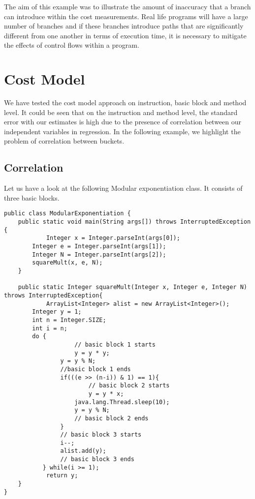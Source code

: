 The aim of this example was to illustrate the amount of inaccuracy that a branch can introduce within the cost measurements. Real life programs will have a large number of branches and if these branches introduce paths that are significantly different from one another in terms of execution time, it is necessary to mitigate the effects of control flows within a program. \newline

\section{Cost Model}
We have tested the cost model approach on instruction, basic block and method level. It could be seen that on the instruction and method level, the standard error with our estimates is high due to the presence of correlation between our independent variables in regression. In the following example, we highlight the problem of correlation between buckets.

\subsection{Correlation}

Let us have a look at the following Modular exponentiation class. It consists of three basic blocks.

\singlespacing
\begin{lstlisting}
public class ModularExponentiation {
	public static void main(String args[]) throws InterruptedException {
    		Integer x = Integer.parseInt(args[0]);
        Integer e = Integer.parseInt(args[1]);
        Integer N = Integer.parseInt(args[2]);
		squareMult(x, e, N);
   	}

	public static Integer squareMult(Integer x, Integer e, Integer N) throws InterruptedException{
    		ArrayList<Integer> alist = new ArrayList<Integer>();
        Integer y = 1;
        int n = Integer.SIZE;
        int i = n;
        do {
        			// basic block 1 starts
            		y = y * y;
                y = y % N;
                //basic block 1 ends
                if(((e >> (n-i)) & 1) == 1){
                		// basic block 2 starts
                		y = y * x;
                    java.lang.Thread.sleep(10);
                    y = y % N;
                    // basic block 2 ends
                }
                // basic block 3 starts
                i--;
                alist.add(y);
                // basic block 3 ends
           } while(i >= 1);
    		return y;
    }
}
\end{lstlisting}
\doublespacing

